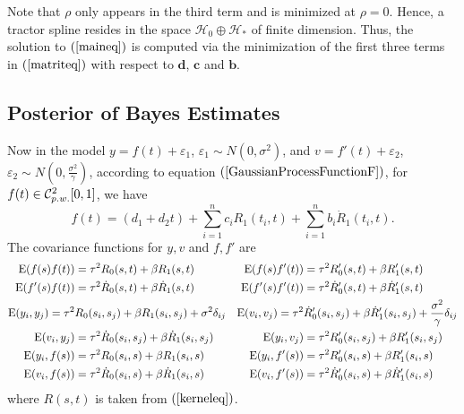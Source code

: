 Note that $\rho$ only appears in the third term and is minimized at $\rho=0$. Hence, a tractor spline resides in the space $\mathcal{H}_0\oplus \mathcal{H}_*$ of finite dimension. Thus, the solution to $(\ref{maineq})$ is computed via the minimization of the first three terms in $(\ref{matriteq})$ with respect to $\mathbf{d}$, $\mathbf{c}$ and $\mathbf{b}$.



\subsection{Posterior of Bayes Estimates}


Now in the model $y=f(t)+\varepsilon_1$, $\varepsilon_1 \sim N(0,\sigma^2)$, and $v=f '(t)+\varepsilon_2$, $\varepsilon_2\sim N(0, \frac{\sigma^2}{\gamma})$, according to equation $(\ref{GaussianProcessFunctionF})$, for $f(t) \in \mathcal{C}_{\footnotesize p.w.}^{2}[0,1]$, we have 
\begin{equation}
f(t)=(d_1+d_2t)+\sum_{i=1}^{n}c_iR_1(t_i,t)+\sum_{i=1}^{n}b_i\dot{R}_1(t_i,t).
\end{equation}
The covariance functions for $y,v$ and $f , f '$ are
\begin{align*}
\mathrm{E} (f(s)f (t))&=\tau^2R_0(s,t)+\beta R_1(s,t) & \mathrm{E} (f(s)f '(t))&=\tau^2R_0'(s,t)+\beta R_1'(s,t) \\
\mathrm{E} (f '(s)f (t))&=\tau^2\dot{R}_0(s,t)+\beta\dot{R}_1(s,t) & \mathrm{E} (f '(s)f '(t))&=\tau^2\dot{R}'_0(s,t)+\beta\dot{R}'_1(s,t) \\
\footnotesize \mathrm{E} (y_i,y_j)=\tau^2 & R_0(s_i,s_j)+\beta R_1(s_i,s_j)+\sigma^2\delta_{ij}   & 
\mathrm{E} (v_i,v_j)=\tau^2&\dot{R}'_0(s_i,s_j)+\beta\dot{R}'_1(s_i,s_j) +\frac{\sigma^2}{\gamma}\delta_{ij} \\ 
\normalsize
\mathrm{E} (v_i,y_j)&=\tau^2\dot{R}_0(s_i,s_j)+\beta \dot{R}_1(s_i,s_j) &
\mathrm{E} (y_i,v_j)&=\tau^2R_0'(s_i,s_j)+\beta R_1'(s_i,s_j)\\
\mathrm{E} (y_i,f(s))&=\tau^2 R_0(s_i,s)+\beta R_1(s_i,s)  & \mathrm{E} (y_i,f '(s))&=\tau^2 R'_0(s_i,s)+\beta R'_1(s_i,s)  \\
\mathrm{E} (v_i,f(s))&=\tau^2 \dot{R}_0(s_i,s)+\beta \dot{R}_1(s_i,s) & \mathrm{E} (v_i,f '(s))&=\tau^2\dot{R}'_0(s_i,s)+\beta \dot{R}'_1(s_i,s)
\end{align*}
where $R(s,t)$ is taken from $(\ref{kerneleq})$. 


